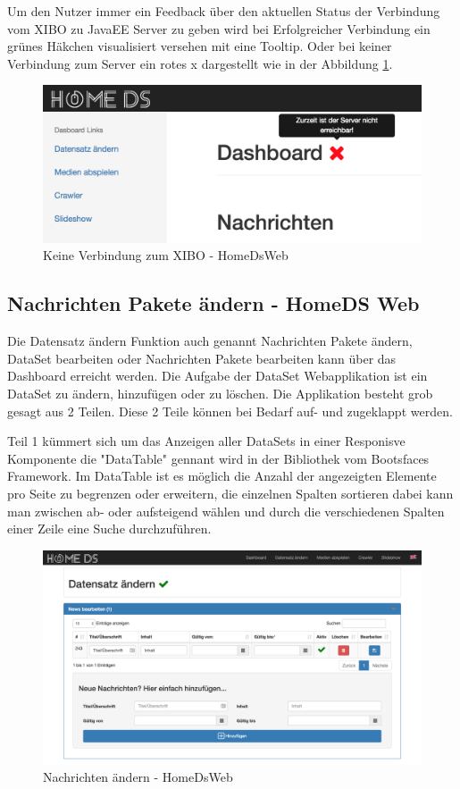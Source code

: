 Um den Nutzer immer ein Feedback über den aktuellen Status der Verbindung vom XIBO zu JavaEE Server zu geben wird bei Erfolgreicher Verbindung ein grünes Häkchen visualisiert versehen mit eine Tooltip. Oder bei keiner Verbindung zum Server ein rotes x dargestellt wie in der Abbildung  \ref{img:NoConnection}.

\begin{figure}[h]
\includegraphics[width=1\textwidth]{images/08_HomeDsWeb/DashboardNoConnection.png}
\caption{Keine Verbindung zum XIBO - HomeDsWeb}
\label{img:NoConnection}
\end{figure}

\subsection{Nachrichten Pakete ändern - HomeDS Web}\label{sec:homedswebdataset}
Die Datensatz ändern Funktion auch genannt Nachrichten Pakete ändern, DataSet bearbeiten oder Nachrichten Pakete bearbeiten kann über das Dashboard erreicht werden.
Die Aufgabe der DataSet Webapplikation ist ein DataSet zu ändern, hinzufügen oder zu löschen. Die Applikation besteht grob gesagt aus 2 Teilen. Diese 2 Teile können bei Bedarf auf- und zugeklappt werden.

Teil 1 kümmert sich um das Anzeigen aller DataSets in einer Responisve Komponente die "DataTable" gennant wird in der Bibliothek vom Bootsfaces Framework. Im DataTable ist es möglich die Anzahl der angezeigten Elemente pro Seite zu begrenzen oder erweitern,  die einzelnen Spalten sortieren dabei kann man zwischen ab- oder aufsteigend wählen und durch die verschiedenen Spalten einer Zeile eine Suche durchzuführen. 


\begin{figure}[h]
\centering
\includegraphics[width=1\textwidth]{images/08_HomeDsWeb/NachrichtenPaket.png}
\caption{Nachrichten ändern - HomeDsWeb}
\label{img:changenews}
\end{figure}


